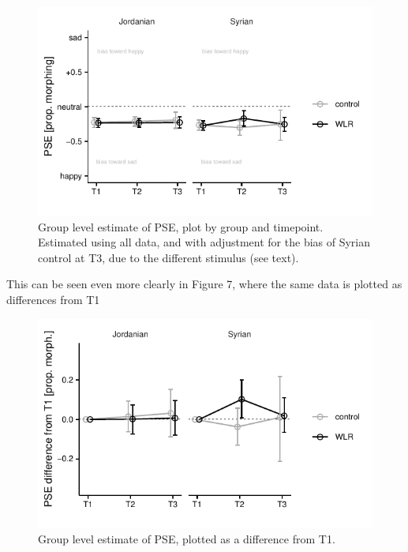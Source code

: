 \documentclass[]{article}
\begin{document}
\begin{figure}[H]

{\centering \includegraphics{WLR-analyses-report_files/figure-latex/unnamed-chunk-8-1} 

}

\caption{Group level estimate of PSE, plot by group and timepoint. Estimated using all data, and with adjustment for the bias of Syrian control at T3, due to the different stimulus (see text).}\label{fig:unnamed-chunk-8}
\end{figure}

This can be seen even more clearly in Figure 7, where the same data is
plotted as differences from T1

\begin{figure}[H]

{\centering \includegraphics{WLR-analyses-report_files/figure-latex/unnamed-chunk-9-1} 

}

\caption{Group level estimate of PSE, plotted as a difference from T1.}\label{fig:unnamed-chunk-9}
\end{figure}
\end{document}
